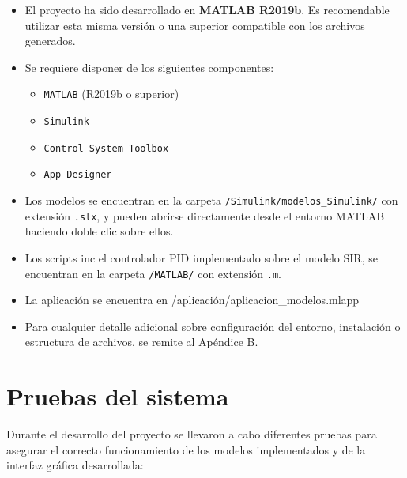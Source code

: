 \begin{itemize}
    \item El proyecto ha sido desarrollado en \textbf{MATLAB R2019b}. Es recomendable utilizar esta misma versión o una superior compatible con los archivos generados.

    \item Se requiere disponer de los siguientes componentes:
    \begin{itemize}
        \item \texttt{MATLAB} (R2019b o superior)
        \item \texttt{Simulink}
        \item \texttt{Control System Toolbox}
        \item \texttt{App Designer}
    \end{itemize}

    \item Los modelos se encuentran en la carpeta  \texttt{/Simulink/modelos\_Simulink/} con extensión \texttt{.slx}, y pueden abrirse directamente desde el entorno MATLAB haciendo doble clic sobre ellos.

    \item Los scripts inc el controlador PID implementado sobre el modelo SIR, se encuentran en la carpeta \texttt{/MATLAB/} con extensión \texttt{.m}.

    \item La aplicación se encuentra en 
    {/aplicación/aplicacion\_modelos.mlapp}
    
    \item Para cualquier detalle adicional sobre configuración del entorno, instalación o estructura de archivos, se remite al Apéndice B.
\end{itemize}

\section{Pruebas del sistema}
Durante el desarrollo del proyecto se llevaron a cabo diferentes pruebas para asegurar el correcto funcionamiento de los modelos implementados y de la interfaz gráfica desarrollada:


